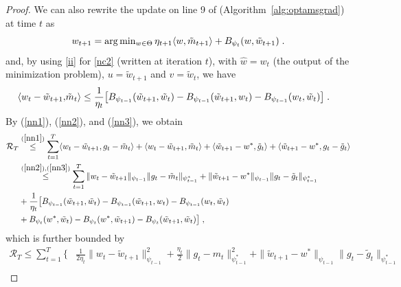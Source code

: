 \documentclass[wcp]{jmlr}
\begin{document}
\begin{proof}
We can also rewrite the update on line 9 of (Algorithm~\ref{alg:optamsgrad}) at time $t$ as
\begin{equation} \label{nc2}
\textstyle w_{t+1} = \arg\min_{w \in \Theta} \eta_{t+1} \langle w, \tilde{m}_{t+1} \rangle + B_{\psi_t}(w, \tilde{w}_{t+1} ) \eqsp.
\end{equation}
and, by using \eqref{ii} for \eqref{nc2} (written at iteration $t$), with $\hat{w} = w_{t}$ (the output of the minimization problem), $u = \tilde{w}_{t+1}$ and $v = \tilde{w}_{t}$, we have
\begin{equation} \label{nn3}
\begin{aligned}
\langle w_t -\tilde{w}_{t+1}, & \tilde{m}_t  \rangle \leq \frac{1}{\eta_t}\big[ B_{\psi_{t-1}}(\tilde{w}_{t+1}, \tilde{w}_{t}) - B_{\psi_{t-1}}(\tilde{w}_{t+1}, w_t ) - B_{\psi_{t-1}}(w_{t}, \tilde{w}_{t}) \big] \eqsp.
\end{aligned}
\end{equation}
By (\ref{nn1}), (\ref{nn2}), and (\ref{nn3}), we obtain
\begin{equation} \label{nnn}
\begin{aligned}
 \mathcal{R}_T & \overset{(\ref{nn1})}{\leq} \sum_{t=1}^T \langle  w_t - \tilde{w}_{t+1} , g_t - \tilde{m}_t \rangle + \langle w_t - \tilde{w}_{t+1}, \tilde{m}_t \rangle + \langle \tilde{w}_{t+1} - w^*, \tilde{g}_t  \rangle+ \langle \tilde{w}_{t+1} - w^*,g_t - \tilde{g}_t  \rangle \\
& \overset{(\ref{nn2}), (\ref{nn3})}{\leq}  \sum_{t=1}^T \| w_t - \tilde{w}_{t+1} \|_{\psi_{t-1}} \| g_t - \tilde{m}_t  \|_{\psi_{t-1}^*} + \|  \tilde{w}_{t+1} - w^* \|_{\psi_{t-1}} \| g_t - \tilde{g}_t  \|_{\psi_{t-1}^*}\\
&+ \frac{1}{\eta_t} \big[ B_{\psi_{t-1}}(\tilde{w}_{t+1}, \tilde{w}_{t}) - B_{\psi_{t-1}}(\tilde{w}_{t+1}, w_t ) - B_{\psi_{t-1}}(w_{t}, \tilde{w}_{t}) \\
& +  B_{\psi_t}( w^*, \tilde{w}_{t}) -B_{\psi_t}(w^*,  \tilde{w}_{t+1} ) - B_{\psi_t}(\tilde{w}_{t+1}, \tilde{w}_{t}) \big] \eqsp,
\end{aligned}
\end{equation}
which is further bounded by
\begin{equation} \label{nnnn}
\begin{aligned}
  \mathcal{R}_T \leq \sum_{t=1}^T \Big\{  & \frac{1}{2 \eta_t} \| w_t - \tilde{w}_{t+1} \|_{\psi_{t-1}}^2 + \frac{\eta_t}{2} \| g_t - m_t  \|_{\psi_{t-1}^*}^2+ \|  \tilde{w}_{t+1} - w^* \|_{\psi_{t-1}} \| g_t - \tilde{g}_t  \|_{\psi_{t-1}^*}\\\

\end{aligned}
\end{equation}
\end{proof}
\end{document}
